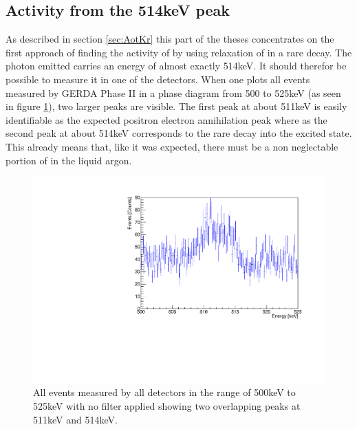  
\subsection{Activity from the 514keV peak}
\label{sec:SAfrom514}

As described in section \ref{sec:AotKr} this part of the theses concentrates on the first approach of finding the activity of  by using relaxation of  in a rare decay. 
The photon emitted carries an energy of almost exactly 514keV. 
It should therefor be possible to measure it in one of the detectors. 
When one plots all events measured by GERDA Phase II in a phase diagram from 500 to 525keV (as seen in figure \ref{fig:ungefiltertes500525}), two larger peaks are visible. 
The first peak at about 511keV is easily identifiable as the expected positron electron annihilation peak where as the second peak at about 514keV corresponds to the rare  decay into the excited  state. 
This already means that, like it was expected, there must be a non neglectable portion of  in the liquid argon.
\\

\begin{figure}[ht]
	\centering
	\ifmakefigures%
	\includegraphics[width=130mm]{./Bilder/GraphNoFiltersAtAllAll.pdf}
	\fi%
	\caption{\label{fig:ungefiltertes500525}
		All events measured by all detectors in the range of 500keV to 525keV with no filter applied showing two overlapping peaks at 511keV and 514keV.
	}
\end{figure}



